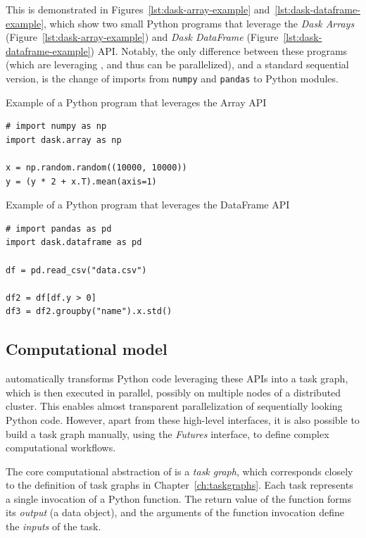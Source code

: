 This is demonstrated in Figures~\ref{lst:dask-array-example} and~\ref{lst:dask-dataframe-example}, which
show two small Python programs that leverage the \emph{Dask Arrays} (Figure~\ref{lst:dask-array-example}) and
\emph{Dask DataFrame}
(Figure~\ref{lst:dask-dataframe-example}) API. Notably, the only difference between these programs (which are
leveraging \dask{}, and thus can be parallelized), and a standard sequential
version, is the change of imports from \texttt{numpy} and \texttt{pandas}
to \dask{} Python modules.

\begin{listing}[h]
	\caption{Example of a Python program that leverages the \dask{} Array API}
	\label{lst:dask-array-example}
	\begin{verbatim}
# import numpy as np
import dask.array as np

x = np.random.random((10000, 10000))
y = (y * 2 + x.T).mean(axis=1)
	\end{verbatim}
\end{listing}

\begin{listing}[h]
	\caption{Example of a Python program that leverages the \dask{} DataFrame API}
	\label{lst:dask-dataframe-example}
	\begin{verbatim}
# import pandas as pd
import dask.dataframe as pd

df = pd.read_csv("data.csv")

df2 = df[df.y > 0]
df3 = df2.groupby("name").x.std()
	\end{verbatim}
\end{listing}

\subsection*{Computational model}
\dask{} automatically transforms Python code leveraging these APIs into a task
graph, which is then executed in parallel, possibly on multiple nodes of a distributed cluster.
This enables almost transparent parallelization of sequentially looking Python code. However, apart
from these high-level interfaces, it is also possible to build a task graph manually, using the
\emph{Futures} interface, to define complex computational workflows.

The core computational abstraction of \dask{} is a \emph{task graph},
which corresponds closely to the definition of task graphs in Chapter~\ref{ch:taskgraphs}.
Each task represents a single invocation of a Python function. The return value of the function
forms its \emph{output} (a data object), and the arguments of the function invocation define the
\emph{inputs} of the task.

